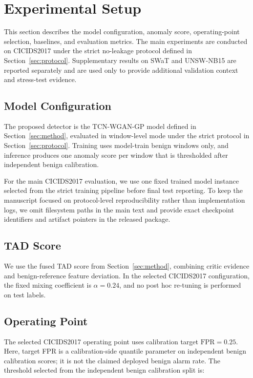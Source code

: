 \section{Experimental Setup}
\label{sec:setup}

This section describes the model configuration, anomaly score, operating-point selection, baselines, and evaluation metrics. The main experiments are conducted on CICIDS2017 under the strict no-leakage protocol defined in Section~\ref{sec:protocol}. Supplementary results on SWaT and UNSW-NB15 are reported separately and are used only to provide additional validation context and stress-test evidence.

\subsection{Model Configuration}

The proposed detector is the TCN-WGAN-GP model defined in Section~\ref{sec:method}, evaluated in window-level mode under the strict protocol in Section~\ref{sec:protocol}. Training uses model-train benign windows only, and inference produces one anomaly score per window that is thresholded after independent benign calibration.

For the main CICIDS2017 evaluation, we use one fixed trained model instance selected from the strict training pipeline before final test reporting. To keep the manuscript focused on protocol-level reproducibility rather than implementation logs, we omit filesystem paths in the main text and provide exact checkpoint identifiers and artifact pointers in the released package.

\subsection{TAD Score}

We use the fused TAD score from Section~\ref{sec:method}, combining critic evidence and benign-reference feature deviation. In the selected CICIDS2017 configuration, the fixed mixing coefficient is $\alpha=0.24$, and no post hoc re-tuning is performed on test labels.

\subsection{Operating Point}

The selected CICIDS2017 operating point uses calibration target $\mathrm{FPR}=0.25$. Here, target FPR is a calibration-side quantile parameter on independent benign calibration scores; it is not the claimed deployed benign alarm rate. The threshold selected from the independent benign calibration split is:

